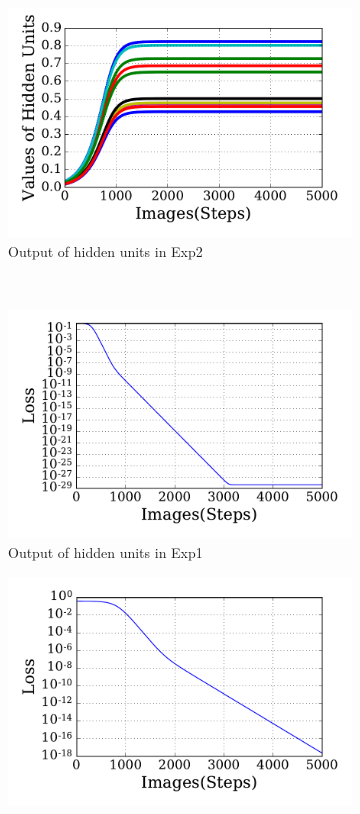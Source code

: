 \begin{figure}
\begin{subfigure}[t]{0.45\textwidth}
		\includegraphics[width=\textwidth]{pics_sdlm/20_exp_AE/exp2_hid_non.pdf}
		\caption{Output of hidden units in Exp2}
	\end{subfigure}\\
	\begin{subfigure}[t]{0.45\textwidth}
		\includegraphics[width=\textwidth]{pics_sdlm/20_exp_AE/exp1_loss.pdf}
		\caption{Output of hidden units in Exp1}
	\end{subfigure}
	\begin{subfigure}[t]{0.45\textwidth}
		\includegraphics[width=\textwidth]{pics_sdlm/20_exp_AE/exp2_loss.pdf}

\end{subfigure}
\end{figure}
